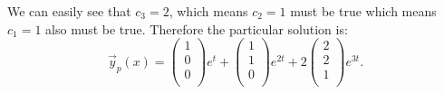 We can easily see that $c_3 = 2$, which means $c_2 = 1$ must be true which means $c_1 = 1$ also must be true. Therefore the particular solution is:
\[ 
\Vec{y}_p(x) = \begin{pmatrix}
1\\
0\\
0\\
\end{pmatrix} e^{t} + \begin{pmatrix}
1\\
1\\
0\\
\end{pmatrix} e^{2t} + 2 \begin{pmatrix}
2\\
2\\
1\\
\end{pmatrix} e^{3t}
.\]

